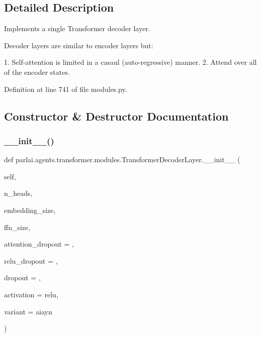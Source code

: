 \subsection{Detailed Description}
\begin{DoxyVerb}Implements a single Transformer decoder layer.

Decoder layers are similar to encoder layers but:

1. Self-attention is limited in a casaul (auto-regressive) manner.
2. Attend over all of the encoder states.
\end{DoxyVerb}
 

Definition at line 741 of file modules.\+py.



\subsection{Constructor \& Destructor Documentation}
\mbox{\label{classparlai_1_1agents_1_1transformer_1_1modules_1_1TransformerDecoderLayer_ad893ac51805fd662173f777c91b2cca4}} 
\subsubsection{\texorpdfstring{\+\_\+\+\_\+init\+\_\+\+\_\+()}{\_\_init\_\_()}}
{\footnotesize\ttfamily def parlai.\+agents.\+transformer.\+modules.\+Transformer\+Decoder\+Layer.\+\_\+\+\_\+init\+\_\+\+\_\+ (\begin{DoxyParamCaption}\item[{}]{self,  }\item[{}]{n\+\_\+heads,  }\item[{}]{embedding\+\_\+size,  }\item[{}]{ffn\+\_\+size,  }\item[{}]{attention\+\_\+dropout = {},  }\item[{}]{relu\+\_\+dropout = {},  }\item[{}]{dropout = {},  }\item[{}]{activation = {\ttfamily \textquotesingle{}relu\textquotesingle{}},  }\item[{}]{variant = {\ttfamily \textquotesingle{}aiayn\textquotesingle{}} }\end{DoxyParamCaption})}



